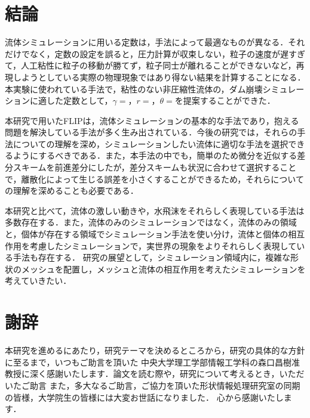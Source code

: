 \documentclass[a4j,12pt]{jreport}
\def\syaji{ \chapter*{謝辞} \addcontentsline{toc}{chapter}{謝辞}}
\begin{document}
\chapter{結論} \label{chapter:6}

流体シミュレーションに用いる定数は，手法によって最適なものが異なる．それだけでなく，定数の設定を誤ると，圧力計算が収束しない，粒子の速度が遅すぎて，人工粘性に粒子の移動が勝てず，粒子同士が離れることができないなど，再現しようとしている実際の物理現象ではあり得ない結果を計算することになる．本実験に使われている手法で，粘性のない非圧縮性流体の，ダム崩壊シミュレーションに適した定数として，$\gamma = $，$r = $，$\theta = $を提案することができた．

本研究で用いたFLIPは，流体シミュレーションの基本的な手法であり，抱える問題を解決している手法が多く生み出されている．今後の研究では，それらの手法についての理解を深め，シミュレーションしたい流体に適切な手法を選択できるようにするべきである．また，本手法の中でも，簡単のため微分を近似する差分スキームを前進差分にしたが，差分スキームも状況に合わせて選択することで，離散化によって生じる誤差を小さくすることができるため，それらについての理解を深めることも必要である．

本研究と比べて，流体の激しい動きや，水飛沫をそれらしく表現している手法は多数存在する．また，流体のみのシミュレーションではなく，流体のみの領域と，個体が存在する領域でシミュレーション手法を使い分け，流体と個体の相互作用を考慮したシミュレーションで，実世界の現象をよりそれらしく表現している手法も存在する．
研究の展望として，シミュレーション領域内に，複雑な形状のメッシュを配置し，メッシュと流体の相互作用を考えたシミュレーションを考えていきたい．
\syaji
\par
本研究を進めるにあたり，研究テーマを決めるところから，研究の具体的な方針に至るまで，いつもご助言を頂いた
中央大学理工学部情報工学科の森口昌樹准教授に深く感謝いたします．論文を読む際や，研究について考えるとき，いただいたご助言
また，多大なるご助言，ご協力を頂いた形状情報処理研究室の同期の皆様，大学院生の皆様には大変お世話になりました．
心から感謝いたします．
\end{document}
